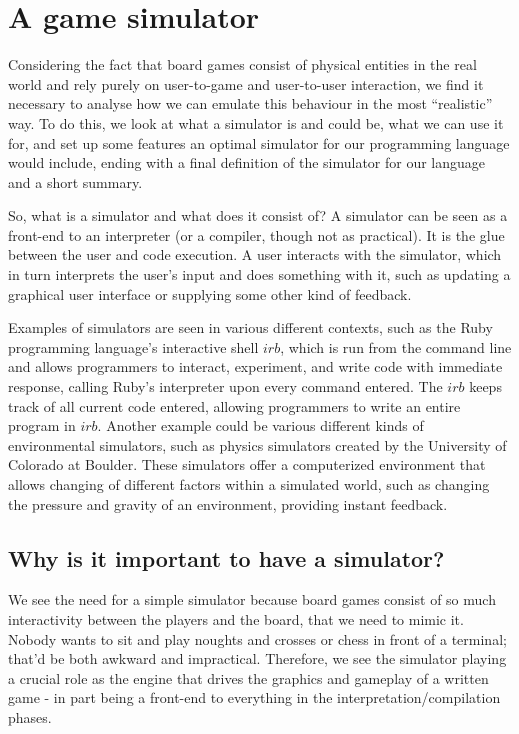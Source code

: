 \section{A game simulator}
\label{sec:simulator}
Considering the fact that board games consist of physical entities in the real
world and rely purely on user-to-game and user-to-user interaction, we find it
necessary to analyse how we can emulate this behaviour in the most ``realistic''
way. To do this, we look at what a simulator is and could be, what we can use it
for, and set up some features an optimal simulator for our programming language
would include, ending with a final definition of the simulator for our language
and a short summary.

So, what is a simulator and what does it consist of? A simulator can be seen as a
front-end to an interpreter (or a compiler, though not as practical). It is the
glue between the user and code execution. A user interacts with the simulator,
which in turn interprets the user's input and does something with it, such as
updating a graphical user interface or supplying some other kind of feedback.

Examples of simulators are seen in various different contexts, such as the
Ruby programming language's interactive shell $irb$\cite{rubyLang}, which is run
from the command line and allows programmers to interact, experiment, and write
code with immediate response, calling Ruby's interpreter upon every command
entered. The $irb$ keeps track of all current code entered, allowing programmers
to write an entire program in $irb$. Another example could be various different
kinds of environmental simulators, such as physics simulators created by the
University of Colorado at Boulder\cite{colSim}. These simulators offer a
computerized environment that allows changing of different factors within a
simulated world, such as changing the pressure and gravity of an environment,
providing instant feedback.

\subsection{Why is it important to have a simulator?}
We see the need for a simple simulator because board games consist of so much
interactivity between the players and the board, that we need to mimic it.
Nobody wants to sit and play noughts and crosses or chess in front of a
terminal; that'd be both awkward and impractical. Therefore, we see the
simulator playing a crucial role as the engine that drives the graphics and
gameplay of a written game - in part being a front-end to everything in the
interpretation/compilation phases.

